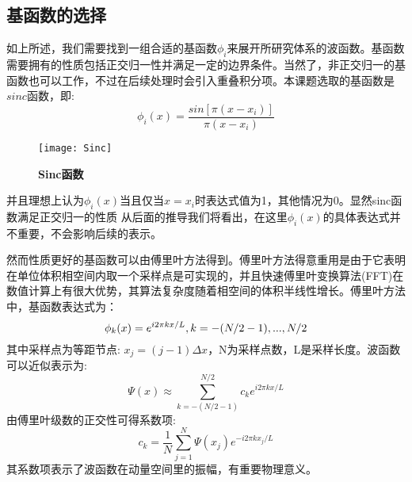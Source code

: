 \subsection{基函数的选择}\label{sec:basis}
如上所述，我们需要找到一组合适的基函数$\phi_i$来展开所研究体系的波函数。基函数需要拥有的性质包括正交归一性并满足一定的边界条件。当然了，非正交归一的基函数也可以工作，不过在后续处理时会引入重叠积分项。本课题选取的基函数是$sinc$函数，即:
\begin{equation}
  \phi_i(x) = \frac{sin[\pi(x-x_i)]}{\pi (x-x_i)}
\end{equation}
\begin{figure}[hbt]
  \center
  \vspace{-1mm}
  \texttt{[image: Sinc]}
  \caption{\textbf{Sinc函数}}
  \label{fig:Sinc}
\end{figure}
并且理想上认为$\phi_i(x)$当且仅当$x=x_i$时表达式值为1，其他情况为0。显然sinc函数满足正交归一的性质
从后面的推导我们将看出，在这里$\phi_i(x)$的具体表达式并不重要，不会影响后续的表示。

然而性质更好的基函数可以由傅里叶方法得到。傅里叶方法得意重用是由于它表明在单位体积相空间内取一个采样点是可实现的，并且快速傅里叶变换算法(FFT)在数值计算上有很大优势，其算法复杂度随着相空间的体积半线性增长\cite{FFT_1,FFT_2,FFT_3}。傅里叶方法中，基函数表达式为：
\begin{equation}
  \small{\phi_k(x) = e^{i 2 \pi k x / L}, k = -(N/2-1),...,N/2}
\end{equation}
其中采样点为等距节点: $x_j = (j-1) \Delta x$，N为采样点数，L是采样长度。波函数可以近似表示为:
\begin{equation}
  \Psi(x) \approx \sum_{k=-(N/2-1)}^{N/2} c_k e^{i 2 \pi k x / L}
\end{equation}
由傅里叶级数的正交性可得系数项:
\begin{equation}
  c_k = \frac{1}{N} \sum_{j=1}^{N} \Psi(x_j) e^{-i 2\pi k x_j /L}
\end{equation}
其系数项表示了波函数在动量空间里的振幅，有重要物理意义。

